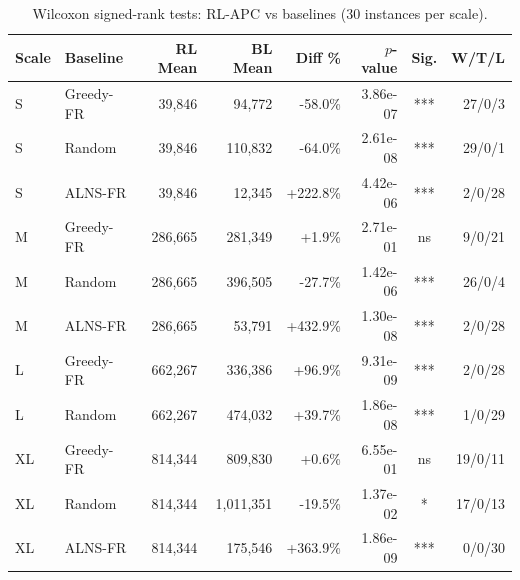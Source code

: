 \begin{table}[htbp]
\centering
\caption{Wilcoxon signed-rank tests: RL-APC vs baselines (30 instances per scale).}
\label{tab:wilcoxon}
\begin{tabular}{llrrrrcr}
\toprule
Scale & Baseline & RL Mean & BL Mean & Diff \% & $p$-value & Sig. & W/T/L \\
\midrule
S & Greedy-FR & 39,846 & 94,772 & -58.0\% & 3.86e-07 & *** & 27/0/3 \\
S & Random & 39,846 & 110,832 & -64.0\% & 2.61e-08 & *** & 29/0/1 \\
S & ALNS-FR & 39,846 & 12,345 & +222.8\% & 4.42e-06 & *** & 2/0/28 \\
M & Greedy-FR & 286,665 & 281,349 & +1.9\% & 2.71e-01 & ns & 9/0/21 \\
M & Random & 286,665 & 396,505 & -27.7\% & 1.42e-06 & *** & 26/0/4 \\
M & ALNS-FR & 286,665 & 53,791 & +432.9\% & 1.30e-08 & *** & 2/0/28 \\
L & Greedy-FR & 662,267 & 336,386 & +96.9\% & 9.31e-09 & *** & 2/0/28 \\
L & Random & 662,267 & 474,032 & +39.7\% & 1.86e-08 & *** & 1/0/29 \\
XL & Greedy-FR & 814,344 & 809,830 & +0.6\% & 6.55e-01 & ns & 19/0/11 \\
XL & Random & 814,344 & 1,011,351 & -19.5\% & 1.37e-02 & * & 17/0/13 \\
XL & ALNS-FR & 814,344 & 175,546 & +363.9\% & 1.86e-09 & *** & 0/0/30 \\
\bottomrule
\end{tabular}
\end{table}